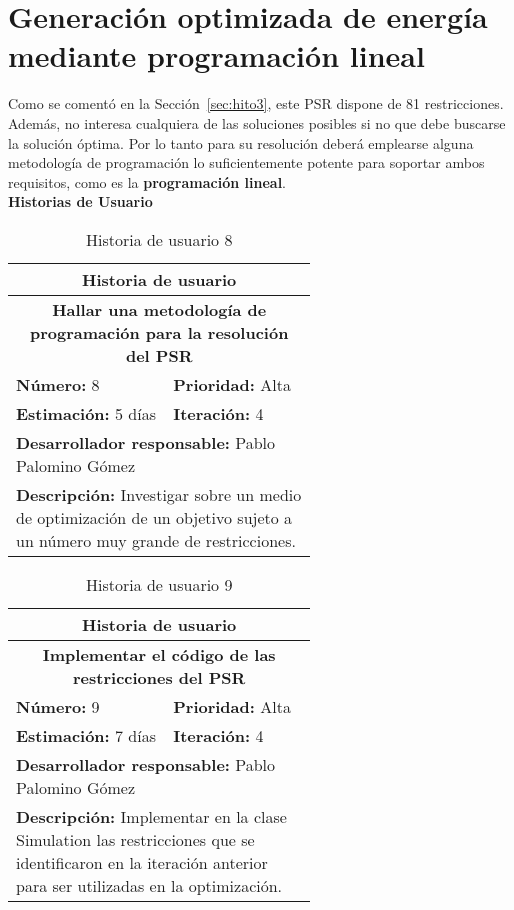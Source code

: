 
\section{Generación optimizada de energía mediante programación lineal}
\label{sec:hito4}
Como se comentó en la Sección~\ref{sec:hito3}, este \gls{PSR} dispone de 81 restricciones. Además, no interesa cualquiera de las soluciones posibles si no que debe buscarse la solución óptima. Por lo tanto para su resolución deberá emplearse alguna metodología de programación lo suficientemente potente para soportar ambos requisitos, como es la \textbf{programación lineal}.\\

\textbf{Historias de Usuario}\\

\begin{table}[H]
        \centering
        \begin{tabular}{|p{0.3\linewidth}|p{0.3\linewidth}|}
          \hline
          \multicolumn{2}{|c|}{Historia de usuario}\\ \hline
          \multicolumn{2}{|c|}{\textbf{Hallar una metodología de programación para la resolución del PSR}}\\ \hline
          \textbf{Número:} 8 & \textbf{Prioridad:} Alta\\ \hline
          \textbf{Estimación:} 5 días & \textbf{Iteración:} 4\\ \hline
          \multicolumn{2}{|l|}{\textbf{Desarrollador responsable:} Pablo Palomino Gómez}\\ \hline
          \multicolumn{2}{|p{0.6\linewidth}|}{\textbf{Descripción:} Investigar sobre un medio de optimización de un objetivo sujeto a un número muy grande de restricciones.}\\ \hline
        \end{tabular}
        \caption{Historia de usuario 8}
        \label{tab:hist8}
\end{table}
\begin{table}[H]
        \centering
        \begin{tabular}{|p{0.3\linewidth}|p{0.3\linewidth}|}
          \hline
          \multicolumn{2}{|c|}{Historia de usuario}\\ \hline
          \multicolumn{2}{|c|}{\textbf{Implementar el código de las restricciones del PSR}}\\ \hline
          \textbf{Número:} 9 & \textbf{Prioridad:} Alta\\ \hline
          \textbf{Estimación:} 7 días & \textbf{Iteración:} 4\\ \hline
          \multicolumn{2}{|l|}{\textbf{Desarrollador responsable:} Pablo Palomino Gómez}\\ \hline
          \multicolumn{2}{|p{0.6\linewidth}|}{\textbf{Descripción:} Implementar en la clase Simulation las restricciones que se identificaron en la iteración anterior para ser utilizadas en la optimización.}\\ \hline
        \end{tabular}
        \caption{Historia de usuario 9}
        \label{tab:hist9}
\end{table}
